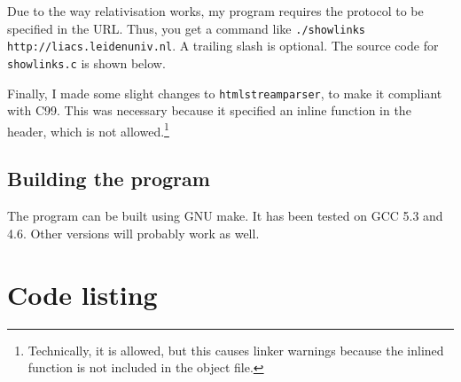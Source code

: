 \documentclass[12pt,a4paper]{article}
\begin{document}
Due to the way relativisation works, my program requires the protocol to be specified in the URL. Thus, you get a command like \texttt{./showlinks http://liacs.leidenuniv.nl}. A trailing slash is optional. The source code for \texttt{showlinks.c} is shown below.

Finally, I made some slight changes to \texttt{htmlstreamparser}, to make it compliant with C99. This was necessary because it specified an inline function in the header, which is not allowed.\footnote{Technically, it is allowed, but this causes linker warnings because the inlined function is not included in the object file.}

\subsection{Building the program}

The program can be built using GNU make. It has been tested on GCC 5.3 and 4.6. Other versions will probably work as well.

\section*{Code listing}

\end{document}
